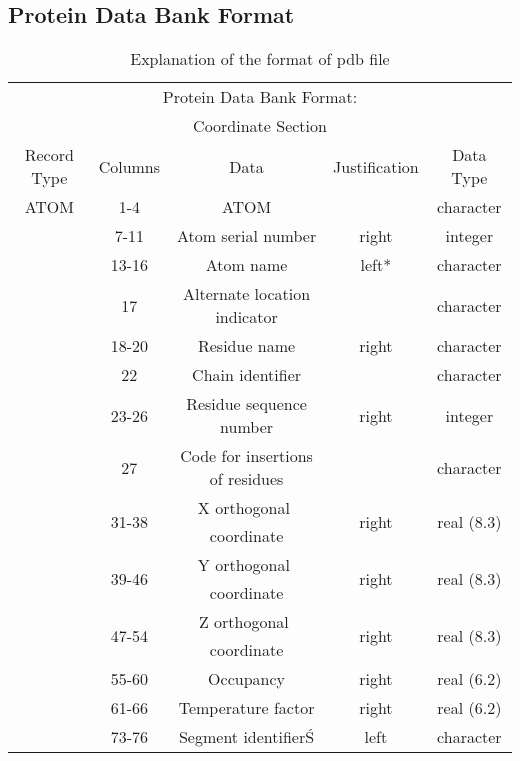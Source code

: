 \begin{appendices}
\chapter{Protein Data Bank Format}
\label{ch:pdb}
\begin{table}[]
\centering
\caption{Explanation of the format of pdb file \cite{pdbformat2}}
\label{tab:pdbformat}
\begin{tabular}{|c|c|c|c|c|}
\hline
\multicolumn{5}{|c|}{Protein Data Bank Format:}                                        \\
\multicolumn{5}{|c|}{Coordinate Section}                                               \\ \hline 
Record Type & Columns & Data                            & Justification & Data Type  \\
ATOM        & 1-4     & ATOM                            &               & character  \\
            & 7-11    & Atom serial number              & right         & integer    \\
            & 13-16   & Atom name                       & left*         & character  \\
            & 17      & Alternate location indicator    &               & character  \\
            & 18-20   & Residue name                    & right         & character  \\
            & 22      & Chain identifier                &               & character  \\
            & 23-26   & Residue sequence number         & right         & integer    \\
            & 27      & Code for insertions of residues &               & character  \\
            & 31-38   & X orthogonal  coordinate       & right         & real (8.3) \\
            & 39-46   & Y orthogonal  coordinate       & right         & real (8.3) \\
            & 47-54   & Z orthogonal  coordinate       & right         & real (8.3) \\
            & 55-60   & Occupancy                       & right         & real (6.2) \\
            & 61-66   & Temperature factor              & right         & real (6.2) \\
            & 73-76   & Segment identifierŚ             & left          & character  \\

\end{tabular}
\end{table}
\end{appendices}
